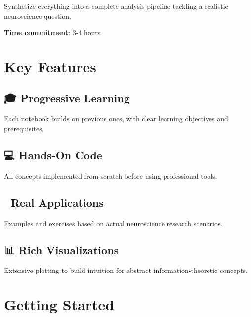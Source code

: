 \documentclass[
  11pt,
  letterpaper,
  oneside,
  openany]{book}
\begin{document}
Synthesize everything into a complete analysis pipeline tackling a
realistic neuroscience question.

\textbf{Time commitment}: 3-4 hours

\section*{Key Features}\label{key-features}


\subsection*{🎓 Progressive Learning}\label{progressive-learning}

Each notebook builds on previous ones, with clear learning objectives
and prerequisites.

\subsection*{💻 Hands-On Code}\label{hands-on-code}

All concepts implemented from scratch before using professional tools.

\subsection*{🔬 Real Applications}\label{real-applications}

Examples and exercises based on actual neuroscience research scenarios.

\subsection*{📊 Rich Visualizations}\label{rich-visualizations}

Extensive plotting to build intuition for abstract information-theoretic
concepts.

\section*{Getting Started}\label{getting-started}
\end{document}
